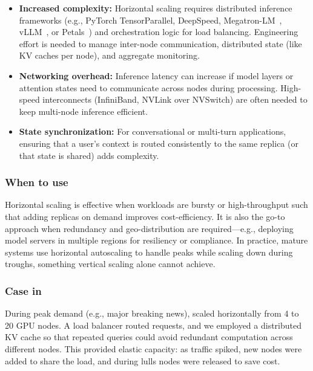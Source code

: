 \begin{tcolorbox}[
  title={\textbf{Horizontal Scaling: Cons}},
  colback=red!5,
  colframe=red!40!black,
  colbacktitle=red!20,
  coltitle=black,
  fonttitle=\bfseries,
  boxrule=0.7pt,
  arc=4pt,
  left=5mm, right=5mm, top=4mm, bottom=4mm,
  before skip=6pt,
  after skip=6pt
]
\begin{itemize}[leftmargin=1.5em, itemsep=3pt]
    \item \textbf{Increased complexity:} Horizontal scaling requires distributed inference frameworks (e.g., PyTorch TensorParallel, DeepSpeed, Megatron-LM~\cite{megatron_lm_2019}, vLLM~\cite{Kwon2023vLLM}, or Petals~\cite{Borzunov2023Petals}) and orchestration logic for load balancing. Engineering effort is needed to manage inter-node communication, distributed state (like KV caches per node), and aggregate monitoring.
    \item \textbf{Networking overhead:} Inference latency can increase if model layers or attention states need to communicate across nodes during processing. High-speed interconnects (InfiniBand, NVLink over NVSwitch) are often needed to keep multi-node inference efficient.
    \item \textbf{State synchronization:} For conversational or multi-turn applications, ensuring that a user's context is routed consistently to the same replica (or that state is shared) adds complexity.
\end{itemize}
\end{tcolorbox}

\subsubsection{When to use}
Horizontal scaling is effective when workloads are bursty or high-throughput such that adding replicas on demand improves cost-efficiency. It is also the go-to approach when redundancy and geo-distribution are required---e.g., deploying model servers in multiple regions for resiliency or compliance. In practice, mature systems use horizontal autoscaling to handle peaks while scaling down during troughs, something vertical scaling alone cannot achieve.

\subsubsection{Case in \ishtar{}}
During peak demand (e.g., major breaking news), \ishtar{} scaled horizontally from 4 to 20 GPU nodes. A load balancer routed requests, and we employed a distributed KV cache so that repeated queries could avoid redundant computation across different nodes. This provided elastic capacity: as traffic spiked, new nodes were added to share the load, and during lulls nodes were released to save cost.

